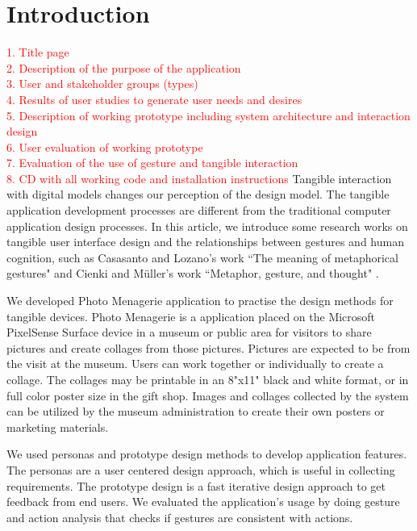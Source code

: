 \documentclass{tei2013}
\begin{document}
\section{Introduction}
\textcolor{red}{1.	Title page\\
2.	Description of the purpose of the application\\
3.	User and stakeholder groups (types)\\
4.	Results of user studies to generate user needs and desires\\
5.	Description of working prototype including system architecture and interaction design\\
6.	User evaluation of working prototype\\
7.	Evaluation of the use of gesture and tangible interaction\\
8.	CD with all working code and installation instructions
}
Tangible interaction with digital models changes our perception of the design model. The tangible application development processes are different from the traditional computer application design processes. In this article, we introduce some research works on tangible user interface design and the relationships between gestures and human cognition, such as Casasanto and Lozano's work ``The meaning of metaphorical gestures" \cite{Casasanto_MG2008_MeaningOfMetaphoricalGestures} and Cienki and M\"{u}ller's work ``Metaphor, gesture, and thought" \cite{Cienki_CHMT2008_MetaphorGestureThought}.

We developed Photo Menagerie  application to practise the design methods for tangible devices. Photo Menagerie is a application placed on the Microsoft PixelSense Surface device in a museum or public area for visitors to share pictures and create collages from those pictures. Pictures are expected to be from the visit at the museum. Users can work together or individually to create a collage. The collages may be printable in an 8"x11" black and white format, or in full color poster size in the gift shop. Images and collages collected by the system can be utilized by the museum administration to create their own posters or marketing materials.

We used personas and prototype design methods to develop application features.  The personas are a user centered design approach, which is useful in collecting requirements.  The prototype design is a fast iterative design approach to get feedback from end users.
We evaluated the application's usage by doing gesture and action analysis that checks if gestures are consistent with actions.
\end{document}
